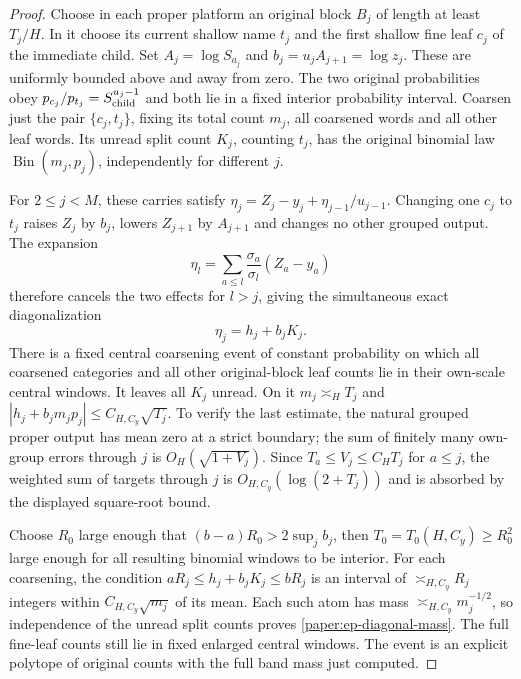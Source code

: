 \begin{proof}
Choose in each proper platform an original block $B_j$ of length at
least $T_j/H$.  In it choose its current shallow name $t_j$ and the
first shallow fine leaf $c_j$ of the immediate child.  Set
$A_j=\log S_{a_j}$ and $b_j=u_jA_{j+1}=\log z_j$.
These are uniformly bounded above and away from zero.  The two
original probabilities obey
$p_{c_j}/p_{t_j}=S_{\rm child}^{u_j-1}$ and both lie in a fixed
interior probability interval.
Coarsen just the pair $\{c_j,t_j\}$, fixing its total count $m_j$,
all coarsened words and all other leaf words.  Its unread split count
$K_j$, counting $t_j$, has the original binomial law
$\operatorname{Bin}(m_j,p_j)$, independently for different $j$.

For $2\leq j<M$, these carries satisfy
$\eta_j=Z_j-y_j+\eta_{j-1}/u_{j-1}$.
Changing one $c_j$ to $t_j$ raises $Z_j$ by $b_j$, lowers
$Z_{j+1}$ by $A_{j+1}$ and changes no other grouped output.
The expansion
\[
 \eta_l=\sum_{a\leq l}\frac{\sigma_a}{\sigma_l}(Z_a-y_a)
\]
therefore cancels the two effects for $l>j$, giving the simultaneous
exact diagonalization
\begin{equation}\label{paper:ep-diagonal-equation}
 \eta_j=h_j+b_jK_j.
\end{equation}
There is a fixed central coarsening event of constant probability on
which all coarsened categories and all other original-block leaf
counts lie in their own-scale central windows.  It leaves all $K_j$
unread.  On it $m_j\asymp_HT_j$ and
$|h_j+b_jm_jp_j|\leq C_{H,C_y}\sqrt{T_j}$.
To verify the last estimate, the natural grouped proper output has
mean zero at a strict boundary; the sum of finitely many own-group
errors through $j$ is $O_H(\sqrt{1+V_j})$. Since
$T_a\leq V_j\leq C_HT_j$ for $a\leq j$, the weighted sum of targets
through $j$ is $O_{H,C_y}(\log(2+T_j))$ and is absorbed by the
displayed square-root bound.

Choose $R_0$ large enough that $(b-a)R_0>2\sup_jb_j$, then
$T_0=T_0(H,C_y)\geq R_0^2$ large enough for all resulting binomial windows to
be interior.  For each coarsening, the condition
$aR_j\leq h_j+b_jK_j\leq bR_j$ is an interval of
$\asymp_{H,C_y}R_j$ integers within $C_{H,C_y}\sqrt{m_j}$ of its mean.
Each such atom has mass $\asymp_{H,C_y}m_j^{-1/2}$, so independence of
the unread split counts proves \eqref{paper:ep-diagonal-mass}.
The full fine-leaf counts still lie in fixed enlarged central windows.
The event is an explicit polytope of original counts with the full
band mass just computed.


\end{proof}

